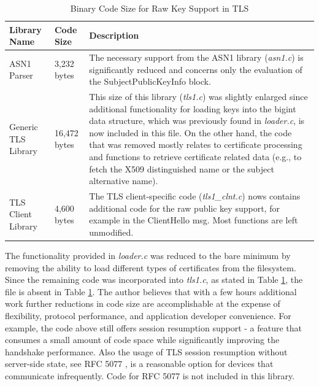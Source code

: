\documentclass[a4paper, 10pt]{IEEEtran}
\begin{document}
\begin{table}[htdp]
\caption{Binary Code Size for Raw Key Support in TLS}
\begin{center}
\begin{tabular}{|p{1cm}|p{}|p{}|}
\hline
\textbf{Library Name} & \textbf{Code Size} & \textbf{Description} \\
\hline\hline
ASN1 Parser & 3,232 bytes & The necessary support from the ASN1 library (\textit{asn1.c}) is significantly reduced and concerns only the evaluation of the SubjectPublicKeyInfo block.\\ 
\hline\hline
Generic TLS Library & 16,472 bytes & This size of this library (\textit{tls1.c}) was slightly enlarged since additional functionality for loading keys into the bigint data structure, which was previously found in \textit{loader.c}, is now included in this file. On the other hand, the code that was removed mostly relates to certificate processing and functions to retrieve certificate related data (e.g., to fetch the X509 distinguished name or the subject alternative name).\\ 
\hline\hline
TLS Client Library & 4,600 bytes & The TLS client-specific code (\textit{tls1\_clnt.c}) nows contains additional code for the raw public key support, for example in the ClientHello msg. Most functions are left unmodified. \\ 
\hline
\end{tabular}
\end{center}
\label{tls-raw-code-table}
\end{table}

The functionality provided in \textit{loader.c} was reduced to the bare minimum by removing the ability to load different types of certificates from the filesystem. Since the remaining code was incorporated into \textit{tls1.c}, as stated in Table \ref{tls-raw-code-table}, the file is absent in Table \ref{tls-raw-code-table}. The author believes that with a few hours additional work further reductions in code size are accomplishable at the expense of flexibility, protocol performance, and application developer convenience. For example, the code above still offers session resumption support - a feature that consumes a small amount of code space while significantly improving the handshake performance. Also the usage of TLS session resumption without server-side state, see RFC 5077 \cite{rfc5077}, is a reasonable option for devices that communicate infrequently. Code for RFC 5077 is not included in this library.
\end{document}
